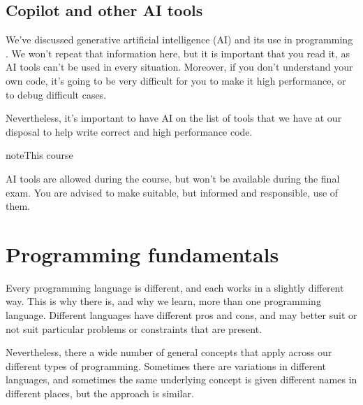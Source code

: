 \documentclass[letterpaper,10pt,british]{sphinxmanual}
\begin{document}
\sphinxstepscope


\section{Co\sphinxhyphen{}pilot and other AI tools}
\label{\detokenize{chapters/software_development_tools/ai_tools:co-pilot-and-other-ai-tools}}\label{\detokenize{chapters/software_development_tools/ai_tools::doc}}
\sphinxAtStartPar
We’ve discussed generative artificial intelligence (AI) and its use in programming . We won’t repeat that information here, but it is important that you read it, as AI tools can’t be used in every situation. Moreover, if you don’t understand your own code, it’s going to be very difficult for you to make it high performance, or to debug difficult cases.

\sphinxAtStartPar
Nevertheless, it’s important to have AI on the list of tools that we have at our disposal to help write correct and high performance code.

\begin{sphinxadmonition}{note}{This course}

\sphinxAtStartPar
AI tools are allowed during the course, but won’t be available during the final exam. You are advised to make suitable, but informed and responsible, use of them.
\end{sphinxadmonition}

\sphinxstepscope


\chapter{Programming fundamentals}
\label{\detokenize{chapters/programming_fundamentals:programming-fundamentals}}\label{\detokenize{chapters/programming_fundamentals:id1}}\label{\detokenize{chapters/programming_fundamentals::doc}}
\sphinxAtStartPar
Every programming language is different, and each works in a slightly different way. This is why there is, and why we learn, more than one programming language. Different languages have different pros and cons, and may better suit or not suit particular problems or constraints that are present.

\sphinxAtStartPar
Nevertheless, there a wide number of general concepts that apply across our different types of programming. Sometimes there are variations in different languages, and sometimes the same underlying concept is given different names in different places, but the approach is similar.
\end{document}

